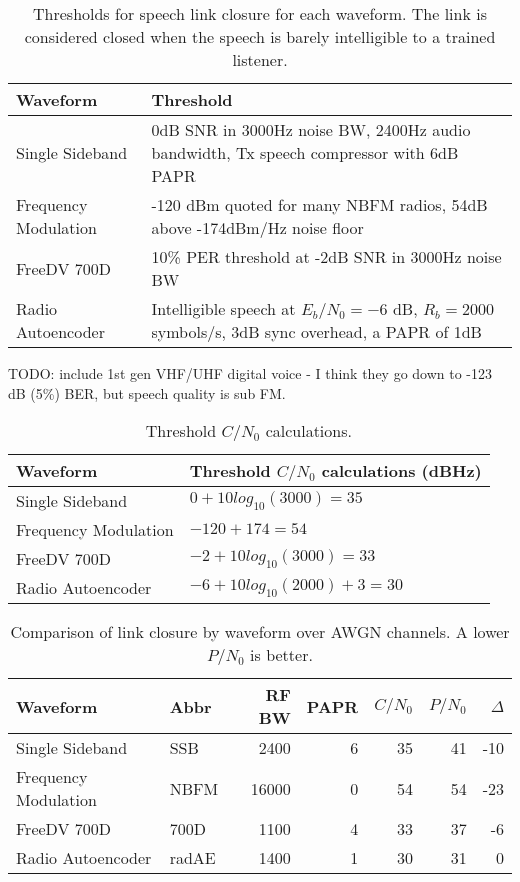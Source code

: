 \documentclass{article}
\begin{document}
\begin{table} [H]
\centering
\begin{tabular}{  m{3.5cm} | m{7cm}  }
 \hline
 Waveform             & Threshold \\
 \hline
 Single Sideband      & 0dB SNR in 3000Hz noise BW, 2400Hz audio bandwidth, Tx speech compressor with 6dB PAPR \\
 Frequency Modulation & -120 dBm quoted for many NBFM radios, 54dB above -174dBm/Hz noise floor \\
 FreeDV 700D          & 10\% PER threshold at -2dB SNR in 3000Hz noise BW \\
 Radio Autoencoder    & Intelligible speech at $E_b/N_0=-6$ dB, $R_b=2000$ symbols/s, 3dB sync overhead, a PAPR of 1dB \\
 \hline
\end{tabular}
\caption{Thresholds for speech link closure for each waveform. The link is considered closed when the speech is barely intelligible to a trained listener.}
\label{tab:waveforms_thresh}
\end{table}

TODO: include 1st gen VHF/UHF digital voice - I think they go down to -123 dB (5\%) BER, but speech quality is sub FM.

\begin{table} [H]
\centering
\begin{tabular}{  m{3.5cm} | m{7cm}  }
 \hline
 Waveform             & Threshold $C/N_0$ calculations (dBHz) \\
 \hline
 Single Sideband      & $0 + 10log_{10}(3000) = 35$ \\
 Frequency Modulation & $-120 + 174 = 54$ \\
 FreeDV 700D          & $-2 + 10log_{10}(3000) = 33$ \\
 Radio Autoencoder    & $-6 + 10log_{10}(2000) + 3 = 30$ \\
 \hline
\end{tabular}
\caption{Threshold $C/N_0$ calculations.}
\label{tab:waveforms_thresh_calc}
\end{table}

\begin{table} [H]
\centering
\begin{tabular}{l l r r r r r}
 \hline
 Waveform             & Abbr  & RF BW & PAPR & $C/N_0$ & $P/N_0$ & $\Delta$ \\
 \hline
 Single Sideband      & SSB   & 2400  &  6 & 35 & 41 & -10 \\
 Frequency Modulation & NBFM  & 16000 &  0 & 54 & 54 & -23 \\
 FreeDV 700D          & 700D  & 1100  &  4 & 33 & 37 & -6  \\
 Radio Autoencoder    & radAE & 1400  &  1 & 30 & 31 &  0  \\
 \hline
\end{tabular}
\caption{Comparison of link closure by waveform over AWGN channels. A lower $P/N_0$ is better.}
\label{tab:waveforms_linkclosure}
\end{table}
\end{document}
